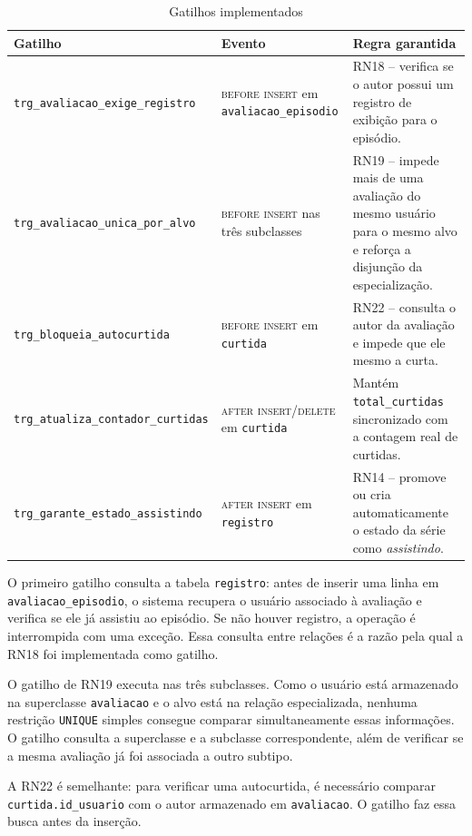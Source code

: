 \documentclass[a4paper,12pt,oneside,openany]{book}
\newcommand{\id}[1]{\texttt{#1}}
\begin{document}
\begin{table}[H]
\centering
\caption{Gatilhos implementados}
\label{tab:gatilhos}
\small
\begin{tabularx}{\textwidth}{@{}llX@{}}
\toprule
\textbf{Gatilho} & \textbf{Evento} & \textbf{Regra garantida} \\
\midrule
\id{trg\_avaliacao\_exige\_registro} &
\textsc{before insert} em \id{avaliacao\_episodio} &
RN18 -- verifica se o autor possui um registro de exibição para o episódio. \\
\addlinespace
\id{trg\_avaliacao\_unica\_por\_alvo} &
\textsc{before insert} nas três subclasses &
RN19 -- impede mais de uma avaliação do mesmo usuário para o mesmo alvo e
reforça a disjunção da especialização. \\
\addlinespace
\id{trg\_bloqueia\_autocurtida} &
\textsc{before insert} em \id{curtida} &
RN22 -- consulta o autor da avaliação e impede que ele mesmo a curta. \\
\addlinespace
\id{trg\_atualiza\_contador\_curtidas} &
\textsc{after insert/delete} em \id{curtida} &
Mantém \id{total\_curtidas} sincronizado com a contagem real de curtidas. \\
\addlinespace
\id{trg\_garante\_estado\_assistindo} &
\textsc{after insert} em \id{registro} &
RN14 -- promove ou cria automaticamente o estado da série como
\textit{assistindo}. \\
\bottomrule
\end{tabularx}
\end{table}

O primeiro gatilho consulta a tabela \id{registro}: antes de inserir uma linha
em \id{avaliacao\_episodio}, o sistema recupera o usuário associado à avaliação
e verifica se ele já assistiu ao episódio. Se não houver registro, a operação é
interrompida com uma exceção. Essa consulta entre relações é a razão pela qual
a RN18 foi implementada como gatilho.

O gatilho de RN19 executa nas três subclasses. Como o usuário está armazenado
na superclasse \id{avaliacao} e o alvo está na relação especializada, nenhuma
restrição \id{UNIQUE} simples consegue comparar simultaneamente essas
informações. O gatilho consulta a superclasse e a subclasse correspondente,
além de verificar se a mesma avaliação já foi associada a outro subtipo.

A RN22 é semelhante: para verificar uma autocurtida, é necessário comparar
\id{curtida.id\_usuario} com o autor armazenado em \id{avaliacao}. O gatilho
faz essa busca antes da inserção.
\end{document}
